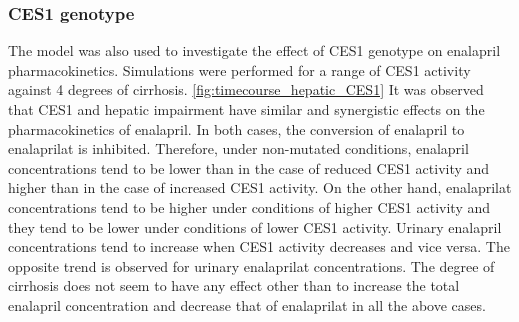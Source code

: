 
\subsubsection{CES1 genotype}
\label{sec:results_ces1_scans}

The model was also used to investigate the effect of CES1 genotype on enalapril pharmacokinetics. Simulations were performed for a range of CES1 activity against 4 degrees of cirrhosis. \ref{fig:timecourse_hepatic_CES1} It was observed that CES1 and hepatic impairment have similar and synergistic effects on the pharmacokinetics of enalapril. In both cases, the conversion of enalapril to enalaprilat is inhibited. Therefore, under non-mutated conditions, enalapril concentrations tend to be lower than in the case of reduced CES1 activity and higher than in the case of increased CES1 activity. On the other hand, enalaprilat concentrations tend to be higher under conditions of higher CES1 activity and they tend to be lower under conditions of lower CES1 activity. Urinary enalapril concentrations tend to increase when CES1 activity decreases and vice versa. The opposite trend is observed for urinary enalaprilat concentrations. The degree of cirrhosis does not seem to have any effect other than to increase the total enalapril concentration and decrease that of enalaprilat in all the above cases.


